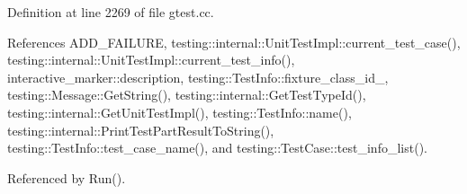 Definition at line 2269 of file gtest.\+cc.



References A\+D\+D\+\_\+\+F\+A\+I\+L\+U\+RE, testing\+::internal\+::\+Unit\+Test\+Impl\+::current\+\_\+test\+\_\+case(), testing\+::internal\+::\+Unit\+Test\+Impl\+::current\+\_\+test\+\_\+info(), interactive\+\_\+marker\+::description, testing\+::\+Test\+Info\+::fixture\+\_\+class\+\_\+id\+\_\+, testing\+::\+Message\+::\+Get\+String(), testing\+::internal\+::\+Get\+Test\+Type\+Id(), testing\+::internal\+::\+Get\+Unit\+Test\+Impl(), testing\+::\+Test\+Info\+::name(), testing\+::internal\+::\+Print\+Test\+Part\+Result\+To\+String(), testing\+::\+Test\+Info\+::test\+\_\+case\+\_\+name(), and testing\+::\+Test\+Case\+::test\+\_\+info\+\_\+list().



Referenced by Run().


